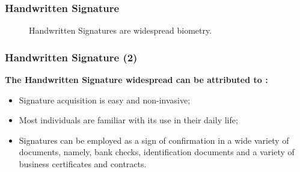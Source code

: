 \documentclass{beamer}
\begin{document}
\begin{frame}
\frametitle{Handwritten Signature}
\begin{figure}[!htb]
\centering
\hspace*{0.1in} %
\hspace*{0.1in}%

 
\caption{Handwritten Signatures are widespread biometry.}  %

\end{figure}
\end{frame}


\begin{frame}
\frametitle{Handwritten Signature (2)}

\textbf{The Handwritten Signature widespread can be attributed to :}
\begin{itemize}
\item Signature acquisition is easy and non-invasive;
\item Most individuals are familiar with its use in their daily life;
\item Signatures can be employed as a sign of confirmation in a wide variety of documents, namely, bank checks, identification documents and a variety of business certificates and contracts.
\end{itemize}
\end{frame}
\end{document}
